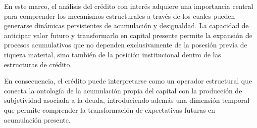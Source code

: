 \documentclass[12pt]{article}
\begin{document}
En este marco, el análisis del crédito con interés adquiere una importancia central para comprender los mecanismos estructurales a través de los cuales pueden generarse dinámicas persistentes de acumulación y desigualdad. La capacidad de anticipar valor futuro y transformarlo en capital presente permite la expansión de procesos acumulativos que no dependen exclusivamente de la posesión previa de riqueza material, sino también de la posición institucional dentro de las estructuras de crédito.

En consecuencia, el crédito puede interpretarse como un operador estructural que conecta la ontología de la acumulación propia del capital con la producción de subjetividad asociada a la deuda, introduciendo además una dimensión temporal que permite comprender la transformación de expectativas futuras en acumulación presente.
\end{document}
